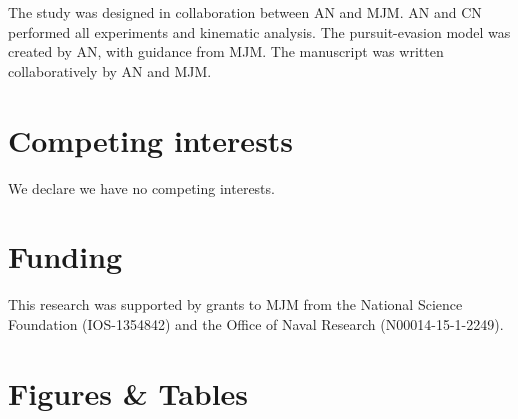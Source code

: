 \documentclass[]{rsos}%
\begin{document}
The study was designed in collaboration between AN and MJM.
AN and CN performed all experiments and kinematic analysis.
The pursuit-evasion model was created by AN, with guidance from MJM. 
The manuscript was written collaboratively by AN and MJM.

\section*{Competing interests}

We declare we have no competing interests.

\section*{Funding}

This research was supported by grants to MJM from the National Science Foundation (IOS-1354842) and the Office of Naval Research (N00014-15-1-2249).





\linespread{1}\selectfont %



\pagebreak



\section*{Figures \& Tables}

\linespread{1.3}\selectfont %
\end{document}
